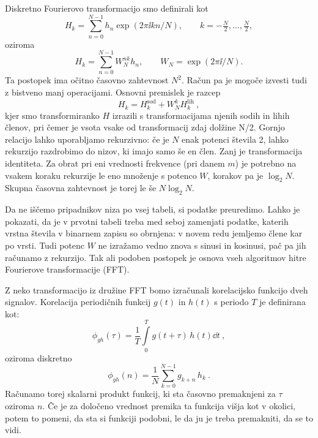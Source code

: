 \documentclass{article}
\begin{document}
Diskretno Fourierovo transformacijo smo definirali kot
\begin{equation*}
H_k = \sum_{n=0}^{N-1}
h_n \exp(2 \pi \ii k n / N),
\qquad k=-\tfrac{N}{2},\dots ,\tfrac{N}{2},
\end{equation*}
oziroma
\begin{equation*}
H_k = \sum_{n=0}^{N-1} W_N^{nk} h_n,
\qquad W_N = \exp(2 \pi \ii / N).
\end{equation*}
Ta postopek ima očitno časovno zahtevnost $N^2$. Račun pa je
mogoče izvesti tudi z bistveno manj operacijami. Osnovni premislek
je razcep
\begin{equation*}
H_k = H_{k}^\mathrm{sod} + W_N^k H_{k}^\mathrm{lih} \>,  
\end{equation*}
kjer smo transformiranko $H$ izrazili s transformacijama njenih
sodih in lihih členov, pri čemer je vsota vsake od transformacij zdaj dolžine N/2.
 Gornjo relacijo lahko uporabljamo rekurzivno:
če je $N$ enak potenci števila 2, lahko rekurzijo razdrobimo
do nizov, ki imajo samo še en člen. Zanj je transformacija
identiteta. Za obrat pri eni vrednosti frekvence (pri danem $m$)
je potrebno na vsakem koraku rekurzije le eno množenje s potenco
$W$, korakov pa je $\log_2 N$.  Skupna časovna zahtevnost je torej
le še $N\log_2 N$.

Da ne iščemo pripadnikov niza po vsej tabeli, si podatke
preuredimo. Lahko je pokazati, da je v prvotni tabeli treba med
seboj zamenjati podatke, katerih vrstna števila v binarnem zapisu
so obrnjena: v novem redu jemljemo člene kar po vrsti. Tudi
potenc $W$ ne izražamo vedno znova s sinusi in kosinusi,
pač pa jih računamo z rekurzijo.  Tak ali podoben postopek
je osnova vseh algoritmov hitre Fourierove transformacije (FFT).

Z neko transformacijo iz družine FFT bomo izračunali korelacijsko
funkcijo dveh signalov. Korelacija periodičnih funk\-cij $g(t)$ in $h(t)$
s periodo $T$ je definirana kot:
\begin{equation*}
\phi_{gh}(\tau)=\frac{1}{T}\int\limits_0^{T} g(t+\tau)\,h(t)\dd t \>,  
\end{equation*}
oziroma diskretno
\begin{equation*}
  \phi_{gh}(n)= \frac{1}{N}\sum_{k=0}^{N-1} g_{k+n}\, h_k \>.
\end{equation*}
Računamo torej skalarni produkt funkcij, ki sta časovno premaknjeni
za $\tau$ oziroma $n$. Če je za določeno vrednost premika ta
funkcija višja kot v okolici, potem to pomeni, da sta si funkciji
podobni, le da ju je treba premakniti, da se to vidi.
\end{document}
